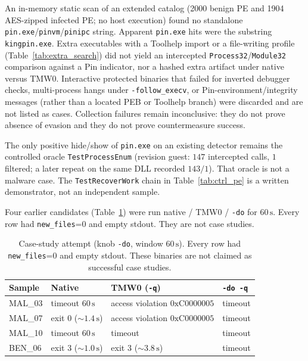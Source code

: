 \documentclass[pdflatex,sn-mathphys-num]{sn-jnl}
\theoremstyle{thmstyleone}
\theoremstyle{thmstyletwo}
\theoremstyle{thmstylethree}
\begin{document}
An in-memory static scan of an extended catalog (2000 benign PE and 1904 AES-zipped infected PE; no host execution) found no standalone \texttt{pin.exe}/\texttt{pinvm}/\texttt{pinipc} string. Apparent \texttt{pin.exe} hits were the substring \texttt{kingpin.exe}. Extra executables with a Toolhelp import or a file-writing profile (Table~\ref{tab:extra_search}) did not yield an intercepted \texttt{Process32}/\texttt{Module32} comparison against a Pin indicator, nor a hashed extra artifact under native versus TMW0. Interactive protected binaries that failed for inverted debugger checks, multi-process hangs under \texttt{-follow\_execv}, or Pin-environment/integrity messages (rather than a located PEB or Toolhelp branch) were discarded and are not listed as cases. Collection failures remain inconclusive: they do not prove absence of evasion and they do not prove countermeasure success.

The only positive hide/show of \texttt{pin.exe} on an existing detector remains the controlled oracle \texttt{TestProcessEnum} (revision guest: $147$ intercepted calls, $1$ filtered; a later repeat on the same DLL recorded $143/1$). That oracle is not a malware case. The \texttt{TestRecoverWork} chain in Table~\ref{tab:ctrl_pe} is a written demonstrator, not an independent sample.

Four earlier candidates (Table~\ref{tab:case_attempt}) were run native / TMW0 / \texttt{-do} for $60\,\mathrm{s}$. Every row had \texttt{new\_files}=0 and empty stdout. They are not case studies.

\begin{table}[t]
\caption{Case-study attempt (knob \texttt{-do}, window $60\,\mathrm{s}$). Every row had \texttt{new\_files}=0 and empty stdout. These binaries are not claimed as successful case studies.}
\label{tab:case_attempt}
\centering
\small
\begin{tabular}{llll}
\toprule
\textbf{Sample} & \textbf{Native} & \textbf{TMW0 (\texttt{-q})} & \texttt{-do -q} \\
\midrule
MAL\_03 & timeout $60\,\mathrm{s}$ & access violation $0\mathrm{xC}0000005$ & timeout \\
MAL\_07 & exit 0 ($\sim 1.4\,\mathrm{s}$) & access violation $0\mathrm{xC}0000005$ & timeout \\
MAL\_10 & timeout $60\,\mathrm{s}$ & timeout & timeout \\
BEN\_06 & exit 3 ($\sim 1.0\,\mathrm{s}$) & exit 3 ($\sim 3.8\,\mathrm{s}$) & timeout \\
\bottomrule
\end{tabular}
\end{table}
\end{document}
